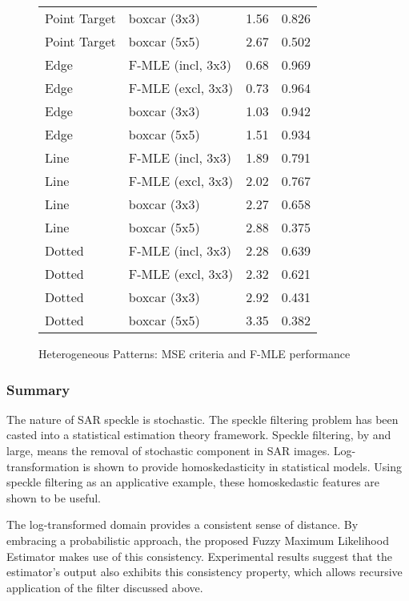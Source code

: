 \begin{figure}[h!]
\begin{minipage}[c]{0.4\textwidth}
\begin{tabular}{|l|l|l|l|}
Point Target 	& boxcar (3x3) 			& 1.56	& 0.826 \\
Point Target 	& boxcar (5x5) 			& 2.67	& 0.502 \\
\hline
Edge 	& F-MLE (incl, 3x3) 	& 0.68	& 0.969 \\
Edge 	& F-MLE (excl, 3x3) 	& 0.73	& 0.964 \\
Edge 	& boxcar (3x3) 			& 1.03	& 0.942 \\
Edge 	& boxcar (5x5) 			& 1.51	& 0.934 \\
\hline
Line 	& F-MLE (incl, 3x3) 	& 1.89	& 0.791 \\
Line 	& F-MLE (excl, 3x3) 	& 2.02	& 0.767 \\
Line 	& boxcar (3x3) 			& 2.27	& 0.658 \\
Line 	& boxcar (5x5) 			& 2.88	& 0.375 \\
\hline
Dotted 			& F-MLE (incl, 3x3) 	& 2.28	& 0.639 \\
Dotted 			& F-MLE (excl, 3x3) 	& 2.32	& 0.621 \\
Dotted 			& boxcar (3x3) 			& 2.92	& 0.431 \\
Dotted 			& boxcar (5x5) 			& 3.35	& 0.382 \\
\hline
\end{tabular}
\end{minipage}
\caption{Heterogeneous Patterns: MSE criteria and F-MLE performance}
\label{fig:Heterogeneous_Patterns}
\end{figure}

\subsubsection{Summary}

The nature of SAR speckle is stochastic. 
The speckle filtering problem has been casted into a statistical estimation theory framework. 
Speckle filtering, by and large, means the removal of stochastic component in SAR images. 
Log-transformation is shown to provide homoskedasticity in statistical models. 
Using speckle filtering as an applicative example, these homoskedastic features are shown to be useful. %

The log-transformed domain provides a consistent sense of distance. By embracing
a probabilistic approach, the proposed Fuzzy Maximum Likelihood Estimator makes
use of this consistency. Experimental results suggest that the estimator’s output also
exhibits this consistency property, which allows recursive application of the filter discussed above. 

